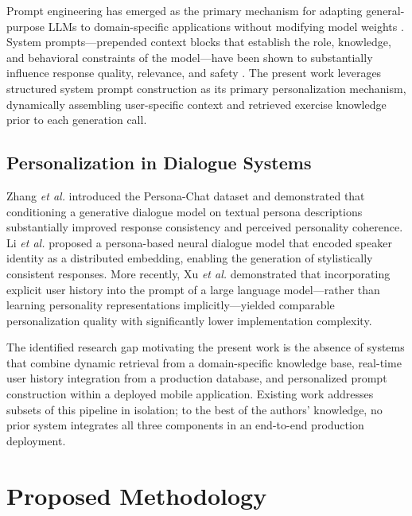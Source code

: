 \documentclass[conference]{IEEEtran}
\begin{document}
Prompt engineering has emerged as the primary mechanism for adapting general-purpose LLMs to domain-specific applications without modifying model weights \cite{liu2023promptsurvey}. System prompts—prepended context blocks that establish the role, knowledge, and behavioral constraints of the model—have been shown to substantially influence response quality, relevance, and safety \cite{white2023prompt}. The present work leverages structured system prompt construction as its primary personalization mechanism, dynamically assembling user-specific context and retrieved exercise knowledge prior to each generation call.

\subsection{Personalization in Dialogue Systems}

Zhang \textit{et al.} \cite{zhang2018personalizing} introduced the Persona-Chat dataset and demonstrated that conditioning a generative dialogue model on textual persona descriptions substantially improved response consistency and perceived personality coherence. Li \textit{et al.} \cite{li2016persona} proposed a persona-based neural dialogue model that encoded speaker identity as a distributed embedding, enabling the generation of stylistically consistent responses. More recently, Xu \textit{et al.} \cite{xu2022beyond} demonstrated that incorporating explicit user history into the prompt of a large language model—rather than learning personality representations implicitly—yielded comparable personalization quality with significantly lower implementation complexity.

The identified research gap motivating the present work is the absence of systems that combine dynamic retrieval from a domain-specific knowledge base, real-time user history integration from a production database, and personalized prompt construction within a deployed mobile application. Existing work addresses subsets of this pipeline in isolation; to the best of the authors' knowledge, no prior system integrates all three components in an end-to-end production deployment.

\section{Proposed Methodology}
\end{document}

